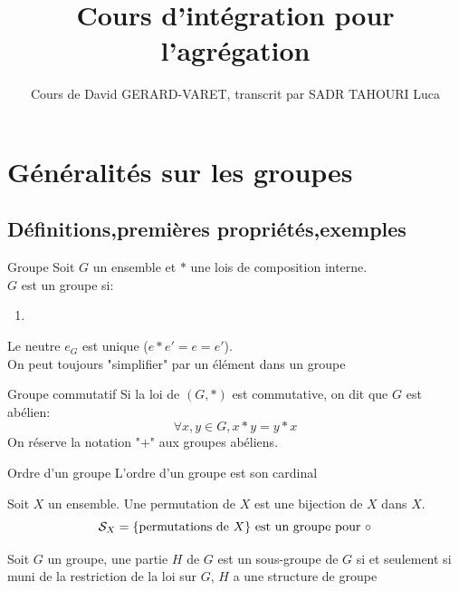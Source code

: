 \documentclass[]{report}
\title{Cours d'intégration pour l'agrégation}
\author{Cours de David GERARD-VARET, transcrit par SADR TAHOURI Luca}
\date{}
\begin{document}
    \maketitle
    \tableofcontents

\chapter{Généralités sur les groupes}

\section{Définitions,premières propriétés,exemples}

\begin{df}{Groupe}{}
    Soit $G$ un ensemble et $*$ une lois de composition interne.\\
    $G$ est un groupe si:
    \begin{enumerate}[label=\roman*]
        \item 
    \end{enumerate}
\end{df}

\begin{re}{}{}
    Le neutre $e_G$ est unique ($e*e'=e=e'$).\\
    On peut toujours "simplifier" par un élément dans un groupe
\end{re}

\begin{df}{Groupe commutatif}{}
    Si la loi de $(G,*)$ est commutative, on dit que $G$ est abélien:
    \[\forall x,y \in G,x*y=y*x\]
    On réserve la notation "$+$" aux groupes abéliens.
\end{df}

\begin{df}{Ordre d'un groupe}{}
    L'ordre d'un groupe est son cardinal
\end{df}

\begin{df}{}{}
    Soit $X$ un ensemble. Une permutation de $X$ est une bijection de $X$ dans $X$.
    \[\mathcal{S}_X=\{\text{permutations de $X$}\}\text{ est un groupe pour $\circ$}\]
\end{df}

\begin{df}{}{}
    Soit $G$ un groupe, une partie $H$ de $G$ est un sous-groupe de $G$ si et seulement si muni de la restriction de la loi sur $G$, $H$ a une structure de groupe
\end{df}
\end{document}
